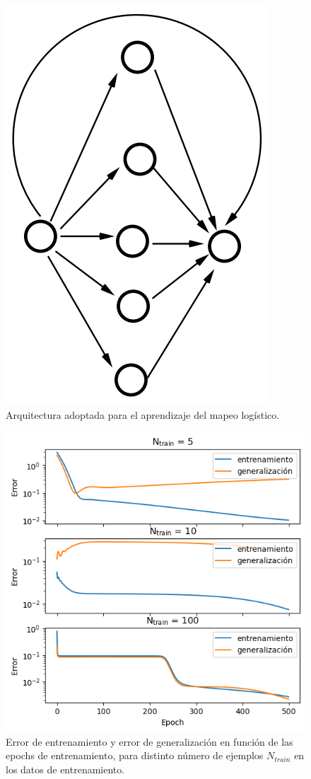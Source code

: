 \documentclass[aps,prb,twocolumn,superscriptaddress,floatfix,longbibliography]{revtex4-2}
\newcounter{para}
\begin{document}
\begin{figure}[h]
    \includegraphics[clip=true,width=0.55\columnwidth]{ej3_arquitectura.png}
    \caption{Arquitectura adoptada para el aprendizaje del mapeo logístico.}
        \label{fig:ej3_arquitectura}
\end{figure}


\begin{figure}[h]
    \includegraphics[clip=true,width=\columnwidth]{ej3_vs_epochs.png}
    \caption{Error de entrenamiento y error de generalización en función de las epochs de entrenamiento, para distinto número de ejemplos \(N_{train}\) en los datos de entrenamiento.}
        \label{fig:ej3_error}
\end{figure}
\end{document}
